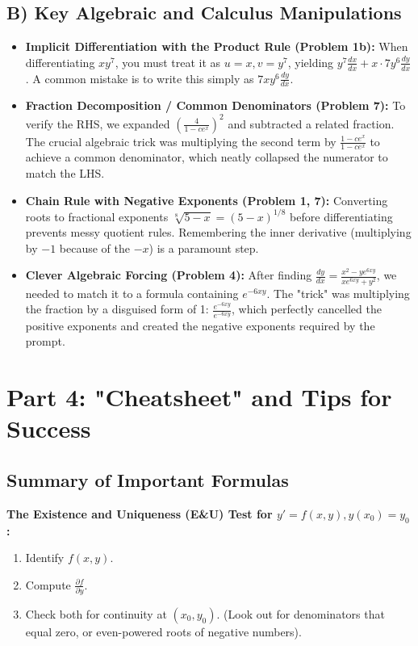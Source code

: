 \documentclass[12pt]{article}
\begin{document}
\subsection{B) Key Algebraic and Calculus Manipulations}
\begin{itemize}
    \item \textbf{Implicit Differentiation with the Product Rule (Problem 1b):} When differentiating $xy^7$, you must treat it as $u = x, v = y^7$, yielding $y^7 \frac{dx}{dx} + x \cdot 7y^6 \frac{dy}{dx}$. A common mistake is to write this simply as $7xy^6 \frac{dy}{dx}$.
    \item \textbf{Fraction Decomposition / Common Denominators (Problem 7):} To verify the RHS, we expanded $\left(\frac{4}{1-ce^x}\right)^2$ and subtracted a related fraction. The crucial algebraic trick was multiplying the second term by $\frac{1-ce^x}{1-ce^x}$ to achieve a common denominator, which neatly collapsed the numerator to match the LHS.
    \item \textbf{Chain Rule with Negative Exponents (Problem 1, 7):} Converting roots to fractional exponents $\sqrt[8]{5-x} = (5-x)^{1/8}$ before differentiating prevents messy quotient rules. Remembering the inner derivative (multiplying by $-1$ because of the $-x$) is a paramount step.
    \item \textbf{Clever Algebraic Forcing (Problem 4):} After finding $\frac{dy}{dx} = \frac{x^2 - ye^{6xy}}{xe^{6xy} + y^2}$, we needed to match it to a formula containing $e^{-6xy}$. The "trick" was multiplying the fraction by a disguised form of 1: $\frac{e^{-6xy}}{e^{-6xy}}$, which perfectly cancelled the positive exponents and created the negative exponents required by the prompt.
\end{itemize}

\newpage
\section{Part 4: "Cheatsheet" and Tips for Success}

\subsection*{Summary of Important Formulas}
\textbf{The Existence and Uniqueness (E\&U) Test for $y' = f(x,y), y(x_0)=y_0$:}
\begin{enumerate}
    \item Identify $f(x,y)$.
    \item Compute $\frac{\partial f}{\partial y}$.
    \item Check both for continuity at $(x_0, y_0)$. (Look out for denominators that equal zero, or even-powered roots of negative numbers).
\end{enumerate}
\end{document}
